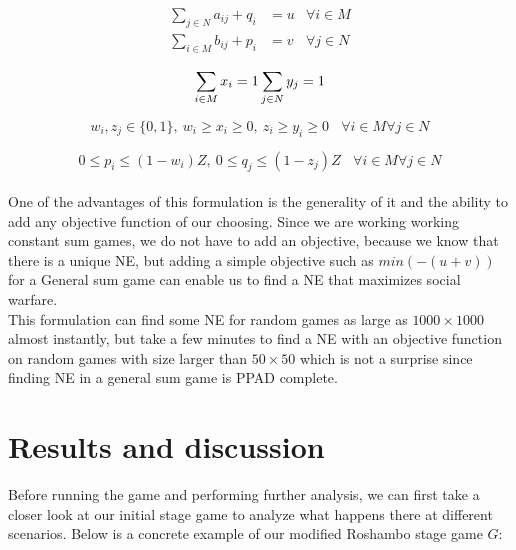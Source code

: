 \documentclass[11pt]{article}
\begin{document}
\begin{align*} 
\sum_{j \in N} a_{ij} + q_i &= u & \forall i \in M \\ 
\sum_{i \in M} b_{ij} + p_i &= v & \forall j \in N
\end{align*}

\begin{equation}
\sum_{i \in M} x_i = 1 \sum_{j \in N} y_j = 1\\ 
\end{equation}

\begin{equation}
w_i, z_j \in \{0,1\}, \ w_i \geq x_i \geq 0, \ z_i \geq y_i \geq 0 \ \ \ \ \forall i \in M \forall j \in N
\end{equation}

\begin{equation}
0 \leq p_i \leq (1 - w_i)Z, \ 0 \leq q_j \leq(1-z_j)Z \ \ \ \ \forall i \in M \forall j \in N
\end{equation} \\

One of the advantages of this formulation is the generality of it and the ability to add any objective function of our choosing. 
Since we are working working constant sum games, we do not have to add an objective, because we know that there is a unique NE, but adding a simple objective such as $min(-(u+v))$ for a General sum game can enable us to find a NE that maximizes social warfare. \\
This formulation can find some NE for random games as large as $1000 \times 1000$ almost instantly, but take a few minutes to find a NE with an objective function on random games with size larger than $50 \times 50$ which is not a surprise since finding NE in a general sum game is PPAD complete. 

\section{Results and discussion}
Before running the game and performing further analysis, we can first take a closer look at our initial stage game to analyze what happens there at different scenarios. Below is a concrete example of our modified Roshambo stage game $G$: \\

\vspace{2mm}
\end{document}
